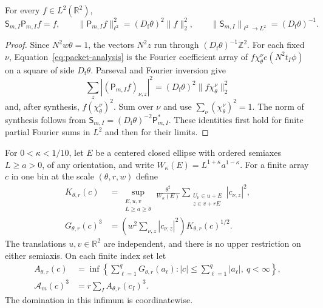 \begin{lemma}\label{lem:packet-frame}
For every $f\in L^2(\mathbb R^2)$,
\begin{equation}\label{eq:packet-frame}
 \mathsf S_{m,I}\mathsf P_{m,I}f=f,
 \qquad
 \|\mathsf P_{m,I}f\|_{\ell^2}^2
       =(D_{\mathrm f}\theta)^2\|f\|_2^2,
 \qquad
 \|\mathsf S_{m,I}\|_{\ell^2\to L^2}
       =(D_{\mathrm f}\theta)^{-1}.
\end{equation}
\end{lemma}

\begin{proof}
Since $N^2w\theta=1$, the vectors $N^2z$ run through
$(D_{\mathrm f}\theta)^{-1}\mathbb Z^2$.  For each fixed
$\nu$, Equation~\eqref{eq:packet-analysis} is the Fourier
coefficient array of
$f\chi_\theta^\nu e(N^2t_I\phi)$ on a square of side
$D_{\mathrm f}\theta$.  Parseval and Fourier inversion give
\[
 \sum_z|(\mathsf P_{m,I}f)_{\nu,z}|^2
   =(D_{\mathrm f}\theta)^2\|f\chi_\theta^\nu\|_2^2
\]
and, after synthesis, $f(\chi_\theta^\nu)^2$.
Sum over $\nu$ and use $\sum_\nu(\chi_\theta^\nu)^2=1$.
The norm of synthesis follows from
$\mathsf S_{m,I}=(D_{\mathrm f}\theta)^{-2}\mathsf P_{m,I}^*$.
These identities first hold for finite partial Fourier sums in
$L^2$ and then for their limits.
\end{proof}

For $0<\kappa<1/10$, let $E$ be a centered closed ellipse with
ordered semiaxes $L\ge a>0$, of any orientation, and write
$W_\kappa(E)=L^{1+\kappa}a^{1-\kappa}$.
For a finite array $c$ in one bin at the scale
$(\theta,r,w)$ define
\begin{align}
 K_{\theta,r}(c)
 &=\sup_{\substack{E,u,v\\L\ge a\ge\theta}}
   \frac{\theta^2}{W_\kappa(E)}
   \sum_{\substack{U_\nu\in u+E\\z\in v+rE}}|c_{\nu,z}|^2,
                 \label{eq:packet-general-capacity}\\
 G_{\theta,r}(c)^3
 &=\left(w^2\sum_{\nu,z}|c_{\nu,z}|^2\right)
                          K_{\theta,r}(c)^{1/2}.
                 \label{eq:packet-gauge}
\end{align}
The translations $u,v\in\mathbb R^2$ are independent, and there
is no upper restriction on either semiaxis.  On each finite index
set let
\begin{align*}
 A_{\theta,r}(c)&=
 \inf\left\{\sum_{\ell=1}^qG_{\theta,r}(a_\ell):
       |c|\le\sum_{\ell=1}^q|a_\ell|,\ q<\infty\right\},\\
 \mathcal A_m(c)^3&=r\sum_I A_{\theta,r}(c_I)^3.
\end{align*}
The domination in this infimum is coordinatewise.

